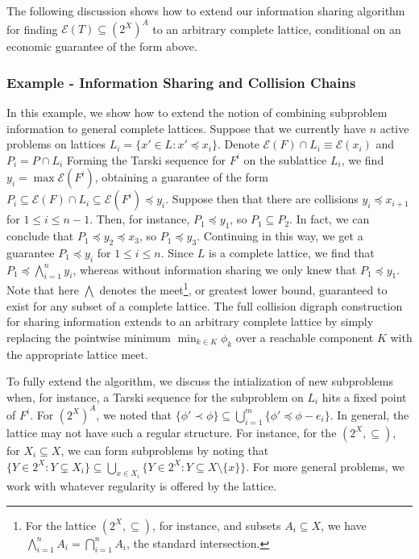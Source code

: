 \documentclass[11pt,reqno]{amsart}
\theoremstyle{definition}
\numberwithin{equation}{section}
\newcommand{\pre}{\phi}
\newcommand{\prealloc}{(2^X)^A}
\newcommand{\sub}{\subseteq}
\newcommand{\fix}{\mathcal{E}}
\newcommand{\peq}{\preceq}
\newcommand{\pe}{\prec}
\newcommand{\oper}{F}
\newcommand{\point}{P}
\newcommand{\lattice}{L}
\begin{document}
The following discussion shows how to extend our information sharing algorithm for finding $\fix(T) \sub \prealloc$ to an arbitrary complete lattice, conditional on an economic guarantee of the form above.

\subsubsection{Example - Information Sharing and Collision Chains}
In this example, we show how to extend the notion of combining subproblem information to general complete lattices.
Suppose that we currently have $n$ active problems on lattices $L_i = \{x' \in \lattice:x'\peq x_i\}$. 
Denote $\fix(\oper) \cap \lattice_i \equiv \fix(x_i)$ and $\point_i = \point \cap L_i$
Forming the Tarski sequence for $\oper^i$ on the sublattice $\lattice_i$, we find $y_i = \max \fix(\oper^i)$, obtaining a guarantee of the form $\point_i \sub \fix(\oper) \cap \lattice_i \sub \fix(\oper^i) \peq y_i$.
Suppose then that there are collisions $y_i \peq x_{i + 1}$ for $1 \leq i \leq n-1$.
Then, for instance, $\point_1 \peq y_1$, so $\point_1 \sub P_2$. 
In fact, we can conclude that $\point_1 \peq y_2 \peq x_3$, so $\point_1 \peq y_3$.
Continuing in this way, we get a guarantee $\point_1 \peq y_i$ for $1 \leq i \leq n$.
Since $\lattice$ is a complete lattice, we find that $P_1 \peq \bigwedge_{i = 1}^n y_i$, whereas without information sharing we only knew that $P_1 \peq y_1$.
Note that here $\bigwedge$ denotes the meet\footnote{For the lattice $(2^X, \sub)$, for instance, and subsets $A_i \sub X$, we have $\bigwedge_{i = 1}^n A_i = \bigcap_{i =1}^n A_i$, the standard intersection.}, or greatest lower bound, guaranteed to exist for any subset of a complete lattice.
The full collision digraph construction for sharing information extends to an arbitrary complete lattice by simply replacing the pointwise minimum $\min_{k \in K} \pre_k$ over a reachable component $K$ with the appropriate lattice meet.

To fully extend the algorithm, we discuss the intialization of new subproblems when, for instance, a Tarski sequence for the subproblem on $\lattice_i$ hits a fixed point of $\oper^i$.
For $\prealloc$, we noted that $\{\pre' \pe \pre\} \sub \bigcup_{i=1}^m \{\pre' \peq \pre - e_i\}$.
In general, the lattice may not have such a regular structure.
For instance, for the $(2^X, \sub)$, for $X_i \sub X$, we can form subproblems by noting that $\{Y \in 2^X: Y \subsetneq X_i\} \sub \bigcup_{x \in X_i} \{Y \in 2^X: Y \sub X \setminus \{x\} \}$.
For more general problems, we work with whatever regularity is offered by the lattice.
\end{document}
